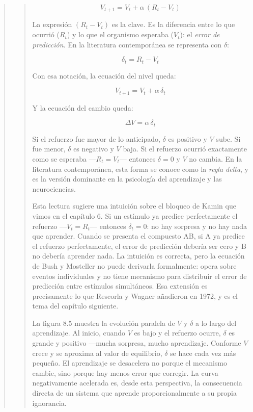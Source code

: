 \documentclass[
  letterpaper,
  DIV=11,
  numbers=noendperiod]{scrreprt}
\begin{document}
\begin{tcolorbox}[enhanced jigsaw, toprule=.15mm, arc=.35mm, colback=white, opacityback=0, colframe=quarto-callout-note-color-frame, breakable, rightrule=.15mm, left=2mm, leftrule=.75mm, bottomrule=.15mm]
\begin{quote}
\begin{quote}
\[V_{t+1} = V_t + \alpha\,(R_t - V_t)\]

La expresión \((R_t - V_t)\) es la clave. Es la diferencia entre lo que
ocurrió (\(R_t\)) y lo que el organismo esperaba (\(V_t\)): el
\emph{error de predicción}. En la literatura contemporánea se representa
con \(\delta\):

\[\delta_t = R_t - V_t\]

Con esa notación, la ecuación del nivel queda:

\[V_{t+1} = V_t + \alpha\,\delta_t\]

Y la ecuación del cambio queda:

\[\Delta V = \alpha\,\delta_t\]

Si el refuerzo fue mayor de lo anticipado, \(\delta\) es positivo y
\(V\) sube. Si fue menor, \(\delta\) es negativo y \(V\) baja. Si el
refuerzo ocurrió exactamente como se esperaba ---\(R_t = V_t\)---
entonces \(\delta = 0\) y \(V\) no cambia. En la literatura
contemporánea, esta forma se conoce como la \emph{regla delta}, y es la
versión dominante en la psicología del aprendizaje y las neurociencias.

Esta lectura sugiere una intuición sobre el bloqueo de Kamin que vimos
en el capítulo 6. Si un estímulo ya predice perfectamente el refuerzo
---\(V_t = R_t\)--- entonces \(\delta_t = 0\): no hay sorpresa y no hay
nada que aprender. Cuando se presenta el compuesto AB, si A ya predice
el refuerzo perfectamente, el error de predicción debería ser cero y B
no debería aprender nada. La intuición es correcta, pero la ecuación de
Bush y Mosteller no puede derivarla formalmente: opera sobre eventos
individuales y no tiene mecanismo para distribuir el error de predicción
entre estímulos simultáneos. Esa extensión es precisamente lo que
Rescorla y Wagner añadieron en 1972, y es el tema del capítulo
siguiente.

La figura 8.5 muestra la evolución paralela de \(V\) y \(\delta\) a lo
largo del aprendizaje. Al inicio, cuando \(V\) es bajo y el refuerzo
ocurre, \(\delta\) es grande y positivo ---mucha sorpresa, mucho
aprendizaje. Conforme \(V\) crece y se aproxima al valor de equilibrio,
\(\delta\) se hace cada vez más pequeño. El aprendizaje se desacelera no
porque el mecanismo cambie, sino porque hay menos error que corregir. La
curva negativamente acelerada es, desde esta perspectiva, la
consecuencia directa de un sistema que aprende proporcionalmente a su
propia ignorancia.

\begin{figure}[H]


\end{figure}
\end{quote}
\end{quote}
\end{tcolorbox}
\end{document}
